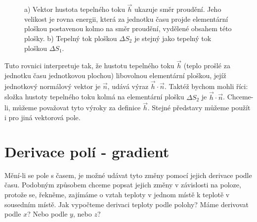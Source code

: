       \begin{figure}[ht!]
        \centering
         \newline                                          
        \caption{a) Vektor hustota tepelného toku $\vec{h}$ ukazuje směr proudění. Jeho velikost
                 je rovna energii, která za jednotku času projde elementární ploškou postavenou 
                 kolmo na směr proudění, vydělené obsahem této plošky. b) Tepelný tok ploškou 
                 $\Delta S_2$ je stejný jako tepelný tok ploškou $\Delta S_1$.
                 \cite[s.~30]{Feynman02}}
        \label{fyz:fig153}
      \end{figure}
      
      Tuto rovnici interpretuje tak, že hustotu tepelného toku $\vec{h}$ (teplo prošlé za jednotku 
      času jednotkovou plochou) libovolnou elementární ploškou, jejíž jednotkový normálový vektor 
      je $\vec{n}$, udává výraz $\vec{h}\cdot\vec{n}$. Taktéž bychom mohli říci: složka hustoty 
      tepelného toku kolmá na elementární plošku $\Delta S_2$ je $\vec{h}\cdot\vec{n}$. Chceme-li, 
      můžeme považovat tyto výro\-ky za definice $\vec{h}$. Stejné představy můžeme použít i pro 
      jiná vektorová pole.
        
  \section{Derivace polí - gradient}
    Mění-li se pole s časem, je možné udávat tyto změny pomocí jejich derivace podle času. Podobným 
    způsobem chceme popsat jejich změny v závislosti na poloze, protože se, řekněme, zajímáme o 
    vztah teploty v jednom místě k teplotě v sousedním místě. Jak vypočteme derivaci teploty podle 
    polohy? Máme derivovat podle $x$? Nebo podle $y$, nebo $z$?
  
